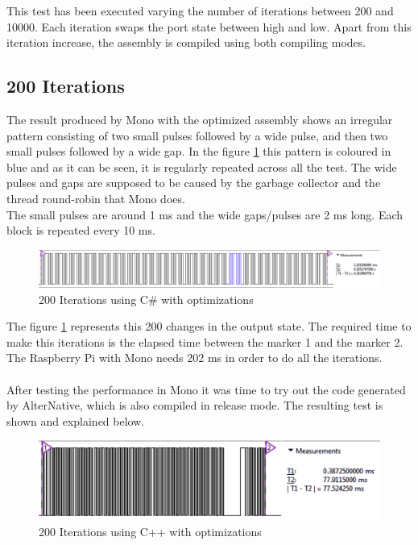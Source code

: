 This test has been executed varying the number of iterations between 200 and 10000. Each iteration swaps the port state between high and low. Apart from this iteration increase, the assembly is compiled using both compiling modes.

\subsection{200 Iterations}\label{SS:200-iterations}
The result produced by Mono with the optimized assembly shows an irregular pattern consisting of two small pulses followed by a wide pulse, and then two small pulses followed by a wide gap. In the figure \ref{fig:gpio-200it-csharp} this pattern is coloured in blue and as it can be seen, it is regularly repeated across all the test. The wide pulses and gaps are supposed to be caused by the garbage collector and the thread round-robin that Mono does.
\\
The small pulses are around 1 ms and the wide gaps/pulses are 2 ms long. Each block is repeated every 10 ms.
\begin{figure}[H]\begin{center}
 \centering
  \captionsetup{justification=centering}
  \includegraphics[scale=0.35]{pictures/performance-tests/GPIO/200/csharp2}
  \caption{200 Iterations using C\# with optimizations\label{fig:gpio-200it-csharp}}
\end{center}\end{figure}
The figure \ref{fig:gpio-200it-csharp} represents this 200 changes in the output state. The required time to make this iterations is the elapsed time between the marker 1 and the marker 2. The Raspberry Pi with Mono needs 202 ms in order to do all the iterations.
\\
\\
After testing the performance in Mono it was time to try out the code generated by AlterNative, which is also compiled in release mode. The resulting test is shown and explained below.
\begin{figure}[H]\begin{center}
 \centering
  \captionsetup{justification=centering}
  \includegraphics[scale=0.35]{pictures/performance-tests/GPIO/200/cxx}
  \caption{200 Iterations using C++ with optimizations \label{fig:gpio-200it-cxx}}
\end{center}\end{figure}

